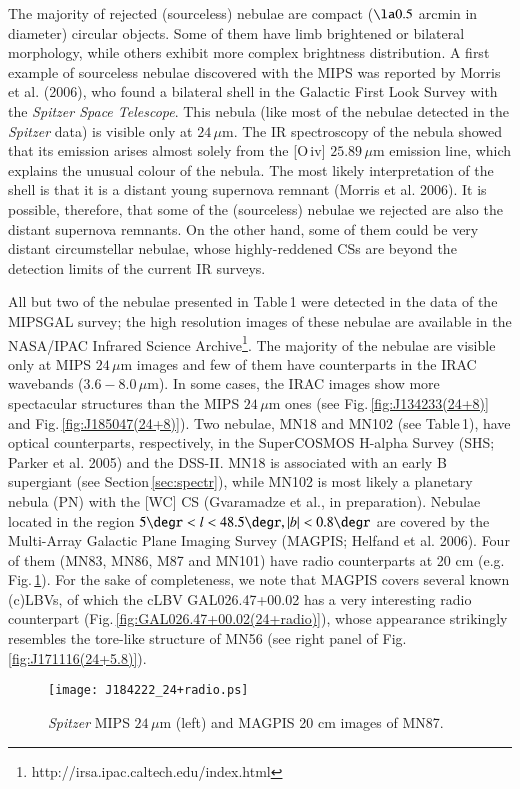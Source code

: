 \documentclass[useAMS]{mn2e}
\begin{document}
The majority of rejected (sourceless) nebulae are compact ($\la 0.5$
arcmin in diameter) circular objects. Some of them have limb
brightened or bilateral morphology, while others exhibit more
complex brightness distribution. A first example of sourceless
nebulae discovered with the MIPS was reported by Morris et al.
(2006), who found a bilateral shell in the Galactic First Look
Survey with the {\it Spitzer Space Telescope}. This nebula (like
most of the nebulae detected in the {\it Spitzer} data) is visible
only at $24\,\mu$m. The IR spectroscopy of the nebula showed that
its emission arises almost solely from the [O\,{\sc iv}] $25.89 \,
\mu$m emission line, which explains the unusual colour of the
nebula. The most likely interpretation of the shell is that it is a
distant young supernova remnant (Morris et al. 2006). It is
possible, therefore, that some of the (sourceless) nebulae we
rejected are also the distant supernova remnants. On the other hand,
some of them could be very distant circumstellar nebulae, whose
highly-reddened CSs are beyond the detection limits of the current
IR surveys.

All but two of the nebulae presented in Table\,1 were detected in
the data of the MIPSGAL survey; the high resolution images of these
nebulae are available in the NASA/IPAC Infrared Science
Archive\footnote{http://irsa.ipac.caltech.edu/index.html}. The
majority of the nebulae are visible only at MIPS $24 \, \mu$m images
and few of them have counterparts in the IRAC wavebands
($3.6-8.0\,\mu$m). In some cases, the IRAC images show more
spectacular structures than the MIPS $24\, \mu$m ones (see
Fig.\,\ref{fig:J134233(24+8)} and Fig.\,\ref{fig:J185047(24+8)}).
Two nebulae, MN18 and MN102 (see Table\,1), have optical
counterparts, respectively, in the SuperCOSMOS H-alpha Survey (SHS;
Parker et al. 2005) and the DSS-II. MN18 is associated with an early
B supergiant (see Section\,\ref{sec:spectr}), while MN102 is most
likely a planetary nebula (PN) with the [WC] CS (Gvaramadze et al.,
in preparation). Nebulae located in the region $5\degr <l<48.5\degr,
|b| < 0.8\degr$ are covered by the Multi-Array Galactic Plane
Imaging Survey (MAGPIS; Helfand et al. 2006). Four of them (MN83,
MN86, M87 and MN101) have radio counterparts at 20 cm (e.g.
Fig.\,\ref{fig:J184222(24+radio)}). For the sake of completeness, we
note that MAGPIS covers several known (c)LBVs, of which the cLBV
GAL026.47+00.02 has a very interesting radio counterpart
(Fig.\,\ref{fig:GAL026.47+00.02(24+radio)}), whose appearance
strikingly resembles the tore-like structure of MN56 (see right
panel of Fig.\,\ref{fig:J171116(24+5.8)}).
%
\begin{figure}
\begin{center}
\texttt{[image: J184222\_24+radio.ps]}
\end{center}
\caption{{\it Spitzer} MIPS $24 \, \mu$m (left) and MAGPIS 20 cm images of MN87.}
\label{fig:J184222(24+radio)}
\end{figure}
%
\end{document}
